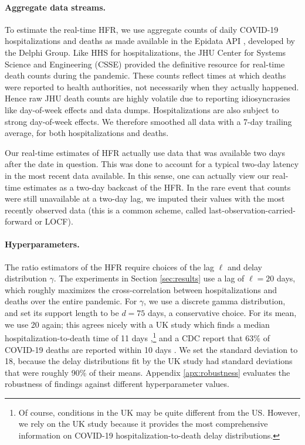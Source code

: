 \documentclass{article}
\begin{document}
\paragraph{Aggregate data streams.}

To estimate the real-time HFR, we use aggregate counts of daily COVID-19 
hospitalizations and deaths as made available in the Epidata API
\citep{Epidata}, developed by the Delphi Group. Like HHS for hospitalizations,
the JHU Center for Systems Science and Engineering (CSSE) provided the
definitive resource for real-time death counts during the pandemic. These counts
reflect times at which deaths were reported to health authorities, not
necessarily when they actually happened. Hence raw JHU death counts are highly
volatile due to reporting idiosyncrasies like day-of-week effects and data
dumps. Hospitalizations are also subject to strong day-of-week effects. We
therefore smoothed all data with a 7-day trailing average, for both
hospitalizations and deaths.  

Our real-time estimates of HFR actually use data that was available two days
after the date in question. This was done to account for a typical two-day
latency in the most recent data available. In this sense, one can
actually view our real-time estimates as a two-day backcast of the HFR. In the
rare event that counts were still unavailable at a two-day lag, we imputed their
values with the most recently observed data (this is a common scheme, called 
last-observation-carried-forward or LOCF).      

\paragraph{Hyperparameters.}

The ratio estimators of the HFR require choices of the lag $\ell$ and delay
distribution $\gamma$. The experiments in Section \ref{sec:results} use a lag of
$\ell=20$ days, which roughly maximizes the cross-correlation between
hospitalizations and deaths over the entire pandemic. For $\gamma$, we use a
discrete gamma distribution, and set its support length to be $d=75$ days, a
conservative choice. For its mean, we use 20 again; this agrees nicely with a UK
study which finds a median hospitalization-to-death time of 11 days
\citep{UKdelay},\footnote{Of course, conditions in the UK may be quite different
  from the US. However, we rely on the UK study because it provides the most
  comprehensive information on COVID-19 hospitalization-to-death delay 
  distributions.}   
and a CDC report that 63\% of COVID-19 deaths are reported within 10 days  
\citep{cdc_deaths_demographic_geographic_2023}. We set the standard deviation to 
18, because the delay distributions fit by the UK study had standard deviations
that were roughly 90\% of their means. Appendix \ref{apx:robustness} evaluates
the robustness of findings against different hyperparameter values.  
\end{document}
